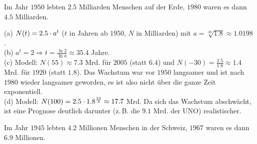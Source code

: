 \documentclass[11pt]{exam}
\begin{document}
\begin{questions}
\noaddpoints
\question[\totalpoints] %
\addpoints
Im Jahr $1950$ lebten $2.5$ Milliarden Menschen auf der Erde, $1980$ waren es dann $4.5$ Milliarden.
{\begin{solution}
		(a) $N(t)=2.5\cdot a^t$ ($t$ in Jahren ab $1950$, $N$ in Milliarden) mit $a=\sqrt[30]{1.8}\approx1.0198$.\\
		(b) $a^t=2\Rightarrow t=\frac{\ln{2}}{\ln{a}}\approx35.4$ Jahre.\\
		(c) Modell: $N(55)\approx7.3$ Mrd. für $2005$ (statt $6.4$) und $N(-30)=\frac{2.5}{1.8}\approx1.4$ Mrd. für $1920$ (statt $1.8$). Das Wachstum war vor $1950$ langsamer und ist nach $1980$ wieder langsamer geworden, es ist also nicht über die ganze Zeit exponentiell.\\
		(d) Modell: $N(100)=2.5\cdot1.8^{\frac{10}{3}}\approx17.7$ Mrd. Da sich das Wachstum abschwächt, ist eine Prognose deutlich darunter (z.\,B. die $9.1$ Mrd. der UNO) realistischer.
\end{solution}}
{}

\question[6]
Im Jahr $1945$ lebten $4.2$ Millionen Menschen in der Schweiz, $1967$ waren es dann $6.9$ Millionen.
\end{questions}
\end{document}
